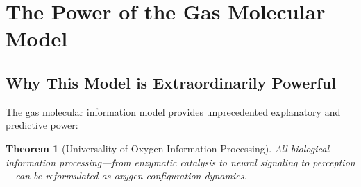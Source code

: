 \documentclass[12pt,a4paper]{article}
\newtheorem{theorem}{Theorem}
\begin{document}
\section{The Power of the Gas Molecular Model}

\subsection{Why This Model is Extraordinarily Powerful}

The gas molecular information model provides unprecedented explanatory and predictive power:

\begin{theorem}[Universality of Oxygen Information Processing]
\label{thm:oxygen_universality}
All biological information processing—from enzymatic catalysis to neural signaling to perception—can be reformulated as oxygen configuration dynamics.
\end{theorem}
\end{document}
